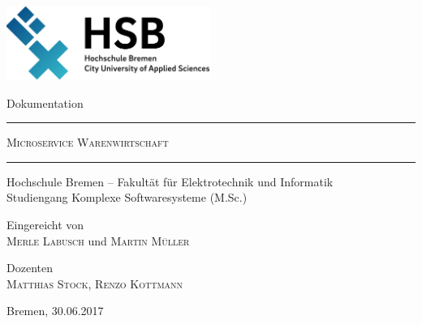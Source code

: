 \begin{titlepage}
\begin{center}

{
\setlength{\parskip}{0pt}

\vspace{5cm}

 	\includegraphics[width=0.50\textwidth]{./Bilder/hs-logo.png}

\vspace{3cm}

  
Dokumentation


\vspace{0.75cm}


{\hrule height 1pt} 


\vspace{0.5cm}

  
{\large{\textsc{Microservice Warenwirtschaft}}} 	  


\vspace{0.5cm}


{\hrule height 1pt}


 \vspace{0.75cm}


Hochschule Bremen -- Fakultät für Elektrotechnik und Informatik \\
Studiengang Komplexe Softwaresysteme (M.Sc.)

\vspace{3cm}


Eingereicht von\\
\textsc{Merle Labusch} und \textsc{Martin Müller}\\

\vspace{1cm}

Dozenten\\
\textsc{Matthias Stock, Renzo Kottmann}\\

\vspace{3cm}

Bremen, 30.06.2017




}

\end{center}
\end{titlepage}
